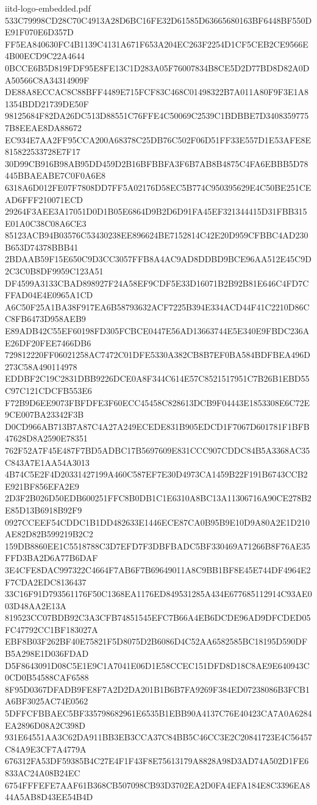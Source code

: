\begin{filecontents*}[overwrite]{iitd-logo-embedded.pdf}
533C79998CD28C70C4913A28D6BC16FE32D61585D63665680163BF6448BF550DE91F070E6D357D
FF5EA840630FC4B1139C4131A671F653A204EC263F2254D1CF5CEB2CE9566E4B00ECD9C22A4644
0BCCE6B5D819FDF95E8FE13C1D283A05F76007834B8CE5D2D77BD8D82A0DA50566C8A34314909F
DE88A8ECCAC8C88BFF4489E715FCF83C468C01498322B7A011A80F9F3E1A81354BDD21739DE50F
98125684F82DA26DC513D88551C76FFE4C50069C2539C1BDBBE7D34083597757B8EEAE8DA88672
EC934E7AA2FF95CCA200A68378C25DB76C502F06D51FF33E557D1E53AFE8E815822533728E7F17
30D99CB916B98AB95DD459D2B16BFBBFA3F6B7AB8B4875C4FA6EBBB5D78445BBAEABE7C0F0A6E8
6318A6D012FE07F7808DD7FF5A02176D58EC5B774C950395629E4C50BE251CEAD6FFF210071ECD
29264F3AEE3A17051D0D1B05E6864D9B2D6D91FA45EF321344415D31FBB315E01A0C38C08A6CE3
85123ACB94B03576C53430238EE896624BE7152814C42E20D959CFBBC4AD230B653D74378BBB41
2BDAAB59F15E650C9D3CC3057FFB8A4AC9AD8DDBD9BCE96AA512E45C9D2C3C0B8DF9959C123A51
DF4599A3133CBAD898927F24A58EF9CDF5E33D16071B2B92B81E646C4FD7CFFAD04E4E0965A1CD
A6C50F25A1BA38F917EA6B58793632ACF7225B394E334ACD44F41C2210D86CC8FB6473D958AEB9
E89ADB42C55EF60198FD305FCBCE0447E56AD13663744E5E340E9FBDC236AE26DF20FEE7466DB6
729812220FF06021258AC7472C01DFE5330A382CB8B7EF0BA584BDFBEA496D273C58A490114978
EDDBF2C19C2831DBB9226DCE0A8F344C614E57C8521517951C7B26B1EBD55C97C121CDCFB553E6
F72B9D6EE9073FBFDFE3F60ECC45458C828613DCB9F04443E1853308E6C72E9CE007BA23342F3B
D0CD966AB713B7A87C4A27A249ECEDE831B905EDCD1F7067D601781F1BFB47628D8A2590E78351
762F52A7F45E487F7BD5ADBC17B5697609E831CCC907CDDC84B5A3368AC35C843A7E1AA54A3013
4B74C5E2F4D20331427199A460C587EF7E30D4973CA1459B22F191B6743CCB2E921BF856EFA2E9
2D3F2B026D50EDB600251FFC8B0DB1C1E6310A8BC13A11306716A90CE278B2E85D13B6918B92F9
0927CCEEF54CDDC1B1DD482633E1446ECE87CA0B95B9E10D9A80A2E1D210AE82D82B599219B2C2
159DB8860EE1C5518788C3D7EFD7F3DBFBADC5BF330469A71266B8F76AE35FFD3BA2D6A77B6DAF
3E4CFE8DAC997322C4664F7AB6F7B69649011A8C9BB1BF8E45E744DF4964E2F7CDA2EDC8136437
33C16F91D793561176F50C1368EA1176ED849531285A434E677685112914C93AE003D48AA2E13A
819523CC07BDB92C3A3CFB74851545EFC7B66A4EB6DCDE96AD9DFCDED05FC47792CC1BF183027A
EBF8B03F262BF40E75821F5D8075D2B6086D4C52AA6582585BC18195D590DFB5A298E1D036FDAD
D5F8643091D08C5E1E9C1A7041E06D1E58CCEC151DFD8D18C8AE9E640943C0CD0B54588CAF6588
8F95D0367DFADB9FE8F7A2D2DA201B1B6B7FA9269F384ED07238086B3FCB1A6BF3025AC74E0562
5DFFCFBBAEC5BF335798682961E6535B1EBB90A4137C76E40423CA7A0A6284EA2896D08A2C398D
931E64551AA3C62DA911BB3EB3CCA37C84BB5C46CC3E2C20841723E4C56457C84A9E3CF7A4779A
676312FA53DF59385B4C27E4F1F43F8E75613179A8828A98D3AD74A502D1FE6833AC24A08B24EC
6754FFFEFE7AAF61B368CB507098CB93D3702EA2D0FA4EFA184E8C3396EA844A5AB8D43EE54B4D

\end{filecontents*}

